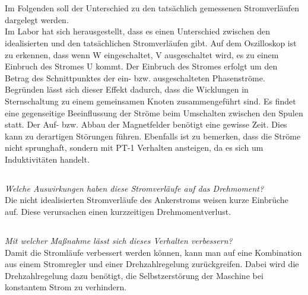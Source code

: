 \chapter{}\label{ch:auf6}
\section{}\label{sec:6a}
Im Folgenden soll der Unterschied zu den tatsächlich gemessenen Stromverläufen dargelegt werden.\\ 
Im Labor hat sich herausgestellt, dass es einen Unterschied zwischen den idealisierten und den tatsächlichen Stromverläufen gibt. Auf dem Oszilloskop ist zu erkennen, dass wenn W eingeschaltet, V ausgeschaltet wird, es zu einem Einbruch des Stromes U kommt. 
Der Einbruch des Stromes erfolgt um den Betrag des Schnittpunktes der ein- bzw. ausgeschalteten Phasenströme. \\
Begründen lässt sich dieser Effekt dadurch, dass die Wicklungen in Sternschaltung zu einem gemeinsamen Knoten zusammengeführt sind. Es findet eine gegenseitige Beeinflussung der Ströme beim Umschalten zwischen den Spulen statt. Der Auf- bzw. Abbau der Magnetfelder benötigt eine gewisse Zeit. Dies kann zu derartigen Störungen führen. Ebenfalls ist zu bemerken, dass die Ströme nicht sprunghaft, sondern mit PT-1 Verhalten ansteigen, da es sich um Induktivitäten handelt.

\section{}\label{sec:6b}
\textit{Welche Auswirkungen haben diese Stromverläufe auf das Drehmoment?}\\
Die nicht idealisierten Stromverläufe des Ankerstroms weisen kurze Einbrüche auf. Diese verursachen einen kurzzeitigen Drehmomentverlust.

\section{}\label{sec:6c}
\textit{Mit welcher Maßnahme lässt sich dieses Verhalten verbessern?}\\
Damit die Stromläufe verbessert werden können, kann man auf eine Kombination aus einem Stromregler und einer Drehzahlregelung zurückgreifen. Dabei wird die Drehzahlregelung dazu benötigt, die Selbstzerstörung der Maschine bei konstantem Strom zu verhindern.
